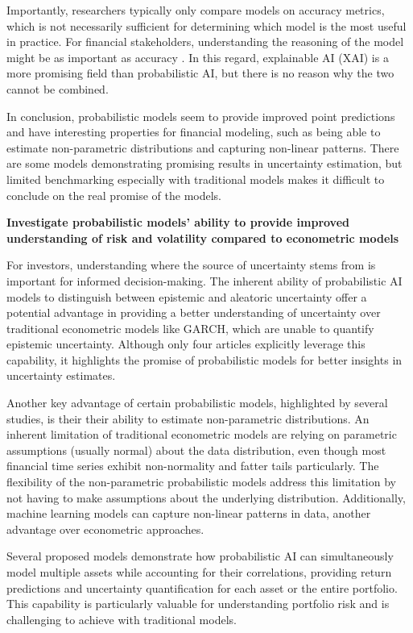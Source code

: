 Importantly, researchers typically only compare models on accuracy metrics, which is not necessarily sufficient for determining which model is the most useful in practice. For financial stakeholders, understanding the reasoning of the model might be as important as accuracy \parencite{Freeborough2022}. In this regard, explainable AI (XAI) is a more promising field than probabilistic AI, but there is no reason why the two cannot be combined.

In conclusion, probabilistic models seem to provide improved point predictions and have interesting properties for financial modeling, such as being able to estimate non-parametric distributions and capturing non-linear patterns. There are some models demonstrating promising results in uncertainty estimation, but limited benchmarking especially with traditional models makes it difficult to conclude on the real promise of the models.


\textbf{Investigate probabilistic models' ability to provide improved understanding of risk and volatility compared to econometric models}\nopagebreak

For investors, understanding where the source of uncertainty stems from is important for informed decision-making. The inherent ability of probabilistic AI models to distinguish between epistemic and aleatoric uncertainty offer a potential advantage in providing a better understanding of uncertainty over traditional econometric models like GARCH, which are unable to quantify epistemic uncertainty. Although only four articles explicitly leverage this capability, it highlights the promise of probabilistic models for better insights in uncertainty estimates.

Another key advantage of certain probabilistic models, highlighted by several studies, is their their ability to estimate non-parametric distributions. An inherent limitation of traditional econometric models are relying on parametric assumptions (usually normal) about the data distribution, even though most financial time series exhibit non-normality and fatter tails particularly. The flexibility of the non-parametric probabilistic models address this limitation by not having to make assumptions about the underlying distribution. Additionally, machine learning models can capture non-linear patterns in data, another advantage over econometric approaches.

Several proposed models demonstrate how probabilistic AI can simultaneously model multiple assets while accounting for their correlations, providing return predictions and uncertainty quantification for each asset or the entire portfolio. This capability is particularly valuable for understanding portfolio risk and is challenging to achieve with traditional models.

